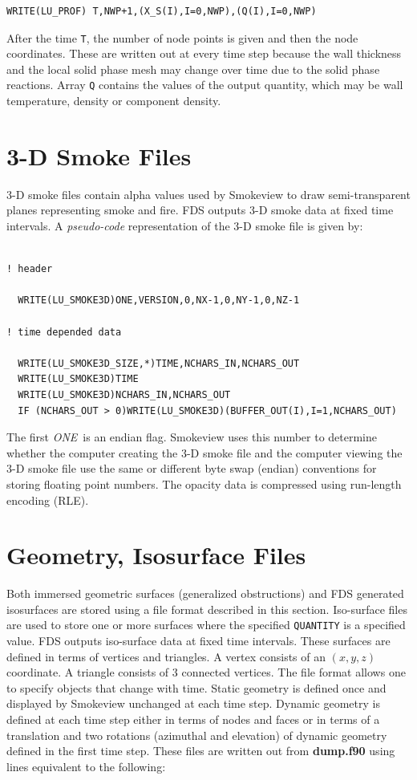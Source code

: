 \documentclass[11pt]{book}
\newcommand{\ct}{\tt\small}
\begin{document}
\footnotesize
\begin{verbatim}
WRITE(LU_PROF) T,NWP+1,(X_S(I),I=0,NWP),(Q(I),I=0,NWP)
\end{verbatim}
\normalsize
After the time {\ct T}, the number of node points is given and then
the node coordinates. These are written out at every time step because
the wall thickness and the local solid phase mesh may change over time
due to the solid phase reactions. Array {\ct Q} contains the values of
the output quantity, which may be wall temperature, density or
component density.

\section{3-D Smoke Files}
\label{out:SMOKE3D}

3-D smoke files contain alpha values used by Smokeview to draw
semi-transparent planes representing smoke and fire.
FDS outputs 3-D smoke data at fixed time
intervals.  A {\em pseudo-code} representation of the 3-D
smoke file is given by:

\footnotesize
\begin{verbatim}

! header

  WRITE(LU_SMOKE3D)ONE,VERSION,0,NX-1,0,NY-1,0,NZ-1

! time depended data

  WRITE(LU_SMOKE3D_SIZE,*)TIME,NCHARS_IN,NCHARS_OUT
  WRITE(LU_SMOKE3D)TIME
  WRITE(LU_SMOKE3D)NCHARS_IN,NCHARS_OUT
  IF (NCHARS_OUT > 0)WRITE(LU_SMOKE3D)(BUFFER_OUT(I),I=1,NCHARS_OUT)

\end{verbatim}
\normalsize

\noindent
The first {\em ONE}\ is an endian flag.  Smokeview uses this number to
determine whether the computer creating the 3-D smoke file and the
computer viewing the 3-D smoke file use the same or different byte
swap (endian) conventions for storing floating point numbers.  The
opacity data is compressed using run-length encoding (RLE).


\section{Geometry, Isosurface Files}
\label{out:GEOMETRY}

Both immersed geometric surfaces (generalized obstructions) and FDS generated isosurfaces are stored using a file format described in this section.
Iso-surface files are used to store one or more surfaces where the specified {\ct QUANTITY} is a specified value.
FDS outputs iso-surface data at fixed
time intervals.  These surfaces are
defined in terms of vertices and triangles.  A vertex consists of an $(x,y,z)$ coordinate.
A triangle
consists of 3 connected vertices.  The file format allows one to specify objects that change with time.
Static geometry is defined once and displayed by Smokeview unchanged at each time step.
Dynamic geometry is defined at each time step either in terms of nodes and faces
or in terms of a translation and two rotations (azimuthal and elevation) of dynamic geometry defined
in the first time step.
These files are written out from {\bf dump.f90} using lines equivalent to the following:
\end{document}
